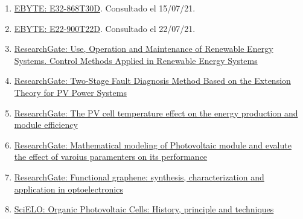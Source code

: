 \documentclass[12pt]{article}
\begin{document}
			\begin{enumerate}
				\item 
				\label{bib: imagen E32}
				\href{https://www.ebyte.com/en/product-view-news.aspx?id=189}{EBYTE: E32-868T30D}. Consultado el 15/07/21.
				
				\item 
				\label{bib: imagen E22}
				\href{https://www.ebyte.com/en/product-view-news.html?id=1117}{EBYTE: E22-900T22D}. Consultado el 22/07/21.
				
				\item
				\label{bib: research gate mppt curve} \href{https://www.researchgate.net/figure/Characteristic-curves-of-MPPT-a-power-voltage-curve-and-b-current-voltage-curve_fig7_278728718}{ResearchGate: Use, Operation and Maintenance of Renewable Energy Systems. Control Methods Applied in Renewable Energy Systems}
				
				\item 
				\label{bib: research gate pv power}
				\href{https://www.researchgate.net/figure/The-I-V-characteristic-curve-of-solar-cells-under-different-temperature_fig1_258388008}{ResearchGate: Two-Stage Fault Diagnosis Method Based on the Extension Theory for PV Power Systems}
				
				\item 
				\label{bib: research gate pv cell temp vs others}
				\href{https://www.researchgate.net/figure/The-PV-module-temperature-and-electrical-power-distribution-together-with-model-inputs_fig1_316548825}{ResearchGate: The PV cell temperature effect on the energy production and module efficiency}
				
				\item 
				\label{bib: research gate pv cell param}
				\href{https://www.researchgate.net/figure/I-V-characteristics-curve-of-a-PV-cell_fig2_313450163}{ResearchGate: Mathematical modeling of Photovoltaic module and evalute the effect of varoius paramenters on its performance}					
			
				\item 
				\label{bib: research gate JV curve solar panel}
				\href{https://www.researchgate.net/figure/J-V-characteristic-of-a-typical-solar-cell-in-the-dark-dashed-line-and-under_fig37_283662836}{ResearchGate: Functional graphene: synthesis, characterization and application in optoelectronics}
				
				\item 
				\label{bib: SciELO}
				\href{https://www.scielo.cl/scielo.php?script=sci_arttext\&pid=S0717-97072008000300001}{SciELO: Organic Photovoltaic Cells: History, principle and techniques}
				

\end{enumerate}
\end{document}
